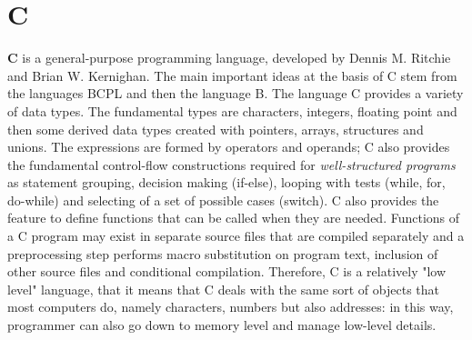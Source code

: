 \documentclass[a4paper,12pt,,titlepage,openright]{report}
\begin{document}
\section{C}
\textbf{C} is a general-purpose programming language, developed by Dennis M. Ritchie and Brian W. Kernighan. The main important ideas at the basis of C stem from the languages BCPL and then the language B.
The language C provides a variety of data types. The fundamental types are characters, integers, floating point and then some derived data types created with pointers, arrays, structures and unions. The expressions are formed by operators and operands; C also provides the fundamental control-flow constructions required for \textit{well-structured programs} as statement grouping, decision making (if-else), looping with tests (while, for, do-while) and selecting of a set of possible cases (switch). C also provides the feature to define functions that can be called when they are needed. 
Functions of a C program may exist in separate source files that are compiled separately and a preprocessing step performs macro substitution on program text, inclusion of other source files and conditional compilation.
Therefore, C is a relatively "low level" language, that it means that C deals with the same sort of objects that most computers do, namely characters, numbers but also addresses: in this way, programmer can also go down to memory level and manage low-level details.
\end{document}
